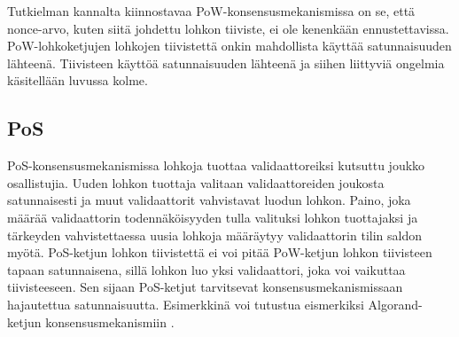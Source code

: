 Tutkielman kannalta kiinnostavaa PoW-konsensusmekanismissa on se, että nonce-arvo, kuten siitä johdettu lohkon tiiviste, ei ole kenenkään ennustettavissa. PoW-lohkoketjujen lohkojen tiivistettä onkin mahdollista käyttää satunnaisuuden lähteenä. Tiivisteen käyttöä satunnaisuuden lähteenä ja siihen liittyviä ongelmia käsitellään luvussa kolme.

\subsection{PoS}

PoS-konsensusmekanismissa lohkoja tuottaa validaattoreiksi kutsuttu joukko osallistujia. Uuden lohkon tuottaja valitaan validaattoreiden joukosta satunnaisesti ja muut validaattorit vahvistavat luodun lohkon. Paino, joka määrää validaattorin todennäköisyyden tulla valituksi lohkon tuottajaksi ja tärkeyden vahvistettaessa uusia lohkoja määräytyy validaattorin tilin saldon myötä. PoS-ketjun lohkon tiivistettä ei voi pitää PoW-ketjun lohkon tiivisteen tapaan satunnaisena, sillä lohkon luo yksi validaattori, joka voi vaikuttaa tiivisteeseen. Sen sijaan PoS-ketjut tarvitsevat konsensusmekanismissaan hajautettua satunnaisuutta. Esimerkkinä voi tutustua eismerkiksi Algorand-ketjun konsensusmekanismiin \cite{gilad_algorand_2017}.


